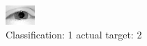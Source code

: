 \begin{figure}[h!]
\begin{center}
\includegraphics[width=0.60\columnwidth]{figures/ID2369_class_1_target_2.png}
\end{center}
\caption{ Classification: 1 actual target: 2}
\label{fig:ID2369_class_1_target_2}
\end{figure}
